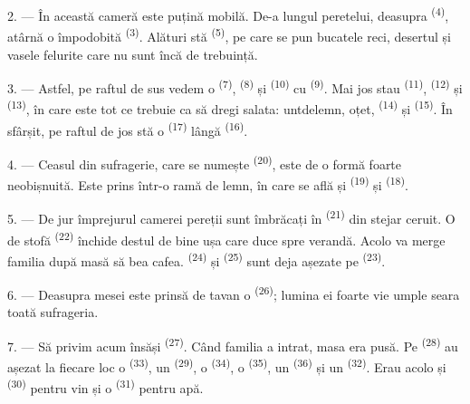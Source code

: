 2. --- În această cameră este puțină mobilă. De-a lungul peretelui, deasupra
 \textsuperscript{(4)}, atârnă o 
împodobită \textsuperscript{(3)}. Alături stă 
\textsuperscript{(5)}, pe care se pun bucatele reci, desertul și vasele felurite
care nu sunt încă de trebuință.

3. --- Astfel, pe raftul de sus vedem o 
\textsuperscript{(7)},  \textsuperscript{(8)} și 
\textsuperscript{(10)} cu  \textsuperscript{(9)}. Mai jos stau
 \textsuperscript{(11)},  \textsuperscript{(12)} și
 \textsuperscript{(13)}, în care este tot ce trebuie ca să dregi
salata: untdelemn, oțet,  \textsuperscript{(14)} și 
\textsuperscript{(15)}. În sfârșit, pe raftul de jos stă o 
\textsuperscript{(17)} lângă  \textsuperscript{(16)}.

4. --- Ceasul din sufragerie, care se numește 
\textsuperscript{(20)}, este de o formă foarte neobișnuită. Este prins într-o ramă
de lemn, în care se află și  \textsuperscript{(19)} și
 \textsuperscript{(18)}.

\VUsaut{4.6mm}
\VUsaut{3.0mm}

5. --- De jur împrejurul camerei pereții sunt îmbrăcați în  \textsuperscript{(21)} din stejar ceruit. O  de stofă
\textsuperscript{(22)} închide destul de bine ușa care duce spre verandă. Acolo va
merge familia după masă să bea cafea.  \textsuperscript{(24)} și
 \textsuperscript{(25)} sunt deja așezate pe
 \textsuperscript{(23)}.

6. --- Deasupra mesei este prinsă de tavan o 
\textsuperscript{(26)}; lumina ei foarte vie umple seara toată sufrageria.

7. --- Să privim acum  însăși \textsuperscript{(27)}. Când familia a
intrat, masa era pusă. Pe  \textsuperscript{(28)} au așezat
la fiecare loc o  \textsuperscript{(33)}, un 
\textsuperscript{(29)}, o  \textsuperscript{(34)}, o
 \textsuperscript{(35)}, un 
\textsuperscript{(36)} și un  \textsuperscript{(32)}. Erau acolo și
 \textsuperscript{(30)} pentru vin și o 
\textsuperscript{(31)} pentru apă.

